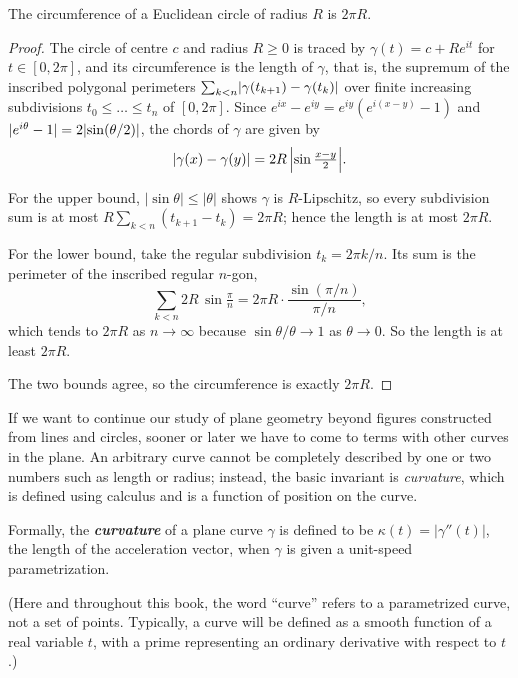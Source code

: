 \begin{theorem}
\label{thm:circumference-theorem}
\leanok
The circumference of a Euclidean circle of radius $R$ is $2\pi R$.
\end{theorem}
\begin{proof}
The circle of centre $c$ and radius $R\ge 0$ is traced by $\gamma(t) = c + R e^{it}$ for
$t\in[0,2\pi]$, and its circumference is the length of $\gamma$, that is, the supremum of the
inscribed polygonal perimeters $\sum_{k<n} \lvert \gamma(t_{k+1}) - \gamma(t_k) \rvert$ over finite
increasing subdivisions $t_0\le\dots\le t_n$ of $[0,2\pi]$. Since
$e^{ix} - e^{iy} = e^{iy}(e^{i(x-y)}-1)$ and $\lvert e^{i\theta}-1 \rvert = 2\lvert\sin(\theta/2)\rvert$, the
chords of $\gamma$ are given by
\[
\lvert \gamma(x)-\gamma(y) \rvert = 2R\,\Bigl\lvert \sin\tfrac{x-y}{2} \Bigr\rvert .
\]

For the upper bound, $\lvert\sin\theta\rvert \le \lvert\theta\rvert$ shows $\gamma$ is $R$-Lipschitz,
so every subdivision sum is at most $R\sum_{k<n}(t_{k+1}-t_k) = 2\pi R$; hence the length is at most
$2\pi R$.

For the lower bound, take the regular subdivision $t_k = 2\pi k/n$. Its sum is the perimeter of the
inscribed regular $n$-gon,
\[
\sum_{k<n} 2R\,\sin\tfrac{\pi}{n} = 2\pi R\cdot\frac{\sin(\pi/n)}{\pi/n},
\]
which tends to $2\pi R$ as $n\to\infty$ because $\sin\theta/\theta \to 1$ as $\theta\to 0$. So the
length is at least $2\pi R$.

The two bounds agree, so the circumference is exactly $2\pi R$.
\end{proof}

If we want to continue our study of plane geometry beyond figures constructed from lines and circles, sooner or later we have to come to terms with other curves in the plane. An arbitrary curve cannot be completely described by one or two numbers such as length or radius; instead, the basic invariant is \textit{curvature}, which is defined using calculus and is a function of position on the curve.

Formally, the \textbf{\textit{curvature}} of a plane curve $\gamma$ is defined to be $\kappa(t) = |\gamma''(t)|$, the length of the acceleration vector, when $\gamma$ is given a unit-speed parametrization.


(Here and throughout this book, the word ``curve'' refers to a parametrized curve, not a set of points. Typically, a curve will be defined as a smooth function of a real variable $t$, with a prime representing an ordinary derivative with respect to $t$.)

